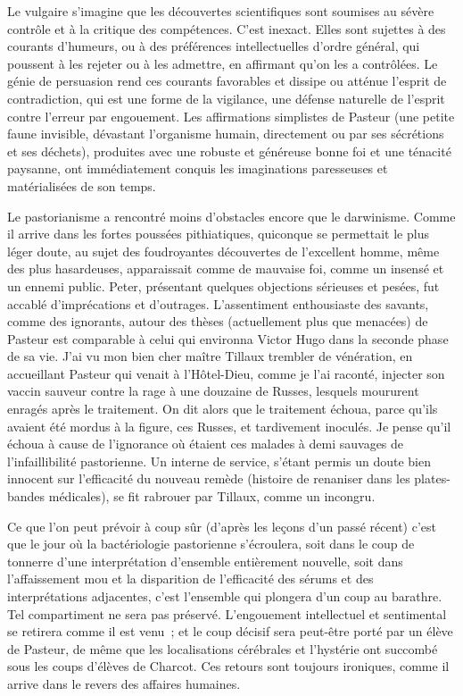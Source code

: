 \documentclass[french,twoside]{book} %
\begin{document}
Le vulgaire s’imagine que les découvertes scientifiques sont soumises au sévère contrôle et à la critique des compétences. C’est inexact. Elles sont sujettes à des courants d’humeurs, ou à des préférences intellectuelles d’ordre général, qui poussent à les rejeter ou à les admettre, en affirmant qu’on les a contrôlées. Le génie de persuasion rend ces courants favorables et dissipe ou atténue l’esprit de contradiction, qui est une forme de la vigilance, une défense naturelle de l’esprit contre l’erreur par engouement. Les affirmations simplistes de Pasteur (une petite faune invisible, dévastant l’organisme humain, directement ou par ses sécrétions et ses déchets), produites avec une robuste et généreuse bonne foi et une ténacité paysanne, ont immédiatement conquis les imaginations paresseuses et matérialisées de son temps.\par
Le pastorianisme a rencontré moins d’obstacles encore que le darwinisme. Comme il arrive dans les fortes poussées pithiatiques, quiconque se permettait le plus léger doute, au sujet des foudroyantes découvertes de l’excellent homme, même des plus hasardeuses, apparaissait comme de mauvaise foi, comme un insensé et un ennemi public. Peter, présentant quelques objections sérieuses et pesées, fut accablé d’imprécations et d’outrages. L’assentiment enthousiaste des savants, comme des ignorants, autour des thèses (actuellement plus que menacées) de Pasteur est comparable à celui qui environna Victor Hugo dans la seconde phase de sa vie. J’ai vu mon bien cher maître Tillaux trembler de vénération, en accueillant Pasteur qui venait à l’Hôtel-Dieu, comme je l’ai raconté, injecter son vaccin sauveur contre la rage à une douzaine de Russes, lesquels moururent enragés après le traitement. On dit alors que le traitement échoua, parce qu’ils avaient été mordus à la figure, ces Russes, et tardivement inoculés. Je pense qu’il échoua à cause de l’ignorance où étaient ces malades à demi sauvages de l’infaillibilité pastorienne. Un interne de service, s’étant permis un doute bien innocent sur l’efficacité du nouveau remède (histoire de renaniser dans les plates-bandes médicales), se fit rabrouer par Tillaux, comme un incongru.\par
Ce que l’on peut prévoir à coup sûr (d’après les leçons d’un passé récent) c’est que le jour où la bactériologie pastorienne s’écroulera, soit dans le coup de tonnerre d’une interprétation d’ensemble entièrement nouvelle, soit dans l’affaissement mou et la disparition de l’efficacité des sérums et des interprétations adjacentes, c’est l’ensemble qui plongera d’un coup au barathre. Tel compartiment ne sera pas préservé. L’engouement intellectuel et sentimental se retirera comme il est venu ; et le coup décisif sera peut-être porté par un élève de Pasteur, de même que les localisations cérébrales et l’hystérie ont succombé sous les coups d’élèves de Charcot. Ces retours sont toujours ironiques, comme il arrive dans le revers des affaires humaines.\par
\end{document}
